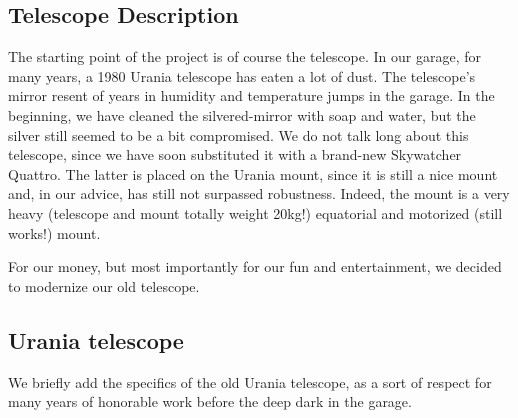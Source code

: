 \documentclass{article}
\begin{document}
    \begin{multicols}{2}
        \section{Telescope Description}
        The starting point of the project is of course the telescope.
        In our garage, for many years, a 1980 Urania telescope has eaten a lot of dust.
        The telescope's mirror resent of years in humidity and temperature jumps in the garage.
        In the beginning, we have cleaned the silvered-mirror with soap and water, but the silver still seemed to be a bit compromised.
        We do not talk long about this telescope, since we have soon substituted it with a brand-new Skywatcher Quattro.
        The latter is placed on the Urania mount, since it is still a nice mount and, in our advice, has still not surpassed robustness.
        Indeed, the mount is a very heavy (telescope and mount totally weight 20kg!) equatorial and motorized (still works!) mount.
        
        For our money, but most importantly for our fun and entertainment, we decided to modernize our old telescope.

        \subsection{Urania telescope}
        We briefly add the specifics of the old Urania telescope, as a sort of respect for many years of honorable work before the deep dark in the garage.


\end{multicols}
\end{document}
